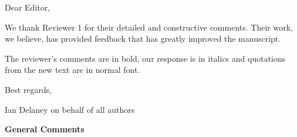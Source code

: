 \documentclass[11pt]{article}
\title{}
\author{}
\begin{document}
Dear Editor,

\vspace{.2cm}

We thank Reviewer 1 for their detailed and constructive comments. Their work, we believe, has provided feedback that has greatly improved the manuscript.

\vspace{.2cm}

The reviewer's comments are in bold, our response is in italics and quotations from the new text are in normal font.

\vspace{.3cm}

Best regards,

\vspace{.75cm}

Ian Delaney on behalf of all authors

\vspace{2cm}

\textbf{General Comments}
\end{document}
